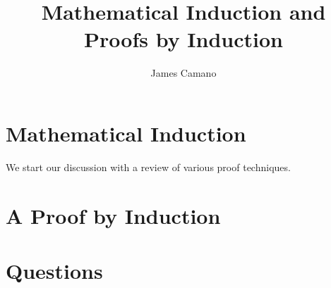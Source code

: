 \documentclass[10pt,a4paper,fleqn]{article}
\author{James Camano}
\title{Mathematical Induction and Proofs by Induction}
\begin{document}
	\maketitle
	\newpage
	
	\part{Mathematical Induction}
		We start our discussion with a review of various proof techniques. 
	\part{A Proof by Induction}
	\part*{Questions}
	
\end{document}
